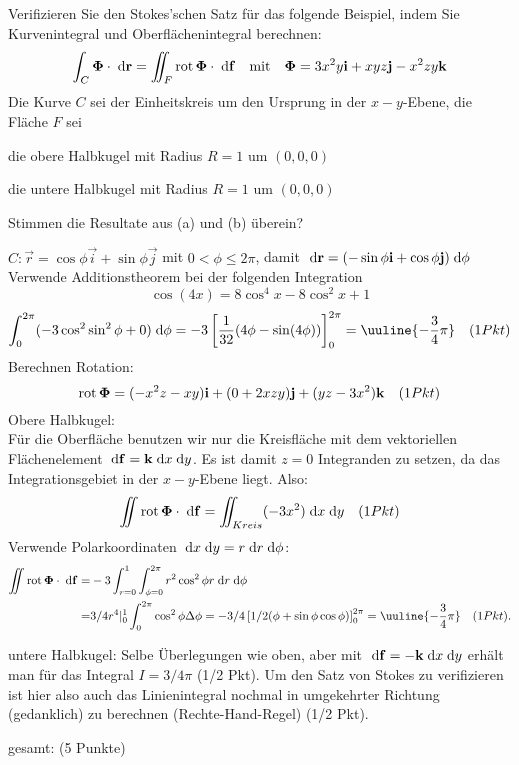 \begin{atiTask}[
  title = Verifikation Satz von Stokes II
]

Verifizieren Sie den Stokes'schen Satz für das folgende Beispiel, indem Sie  Kurvenintegral und Oberflächenintegral berechnen:
\[
\int_C\mathbf{\Phi}\cdot \;\mathrm{d}\mathbf{r}=\iint_F\operatorname{rot} \mathbf{\Phi} \cdot\;\mathrm{d}\mathbf{f}\quad\text{mit}\quad\mathbf{\Phi}=3x^2y\mathbf{i}+xyz\mathbf{j}-x^2zy\mathbf{k}
\]
Die Kurve $C$ sei der Einheitskreis um den Ursprung in der $x-y$-Ebene, die Fläche $F$ sei 
\begin{atiSubtasks}
\item die obere Halbkugel mit Radius $R=1$ um $(0,0,0)$
\item die untere Halbkugel mit Radius $R=1$ um $(0,0,0)$
\end{atiSubtasks}
Stimmen die Resultate aus (a) und (b) überein?

\end{atiTask}

\begin{atiSolution}
\begin{atiSubtasks}
\item $C:\vec{r}=\cos \phi \vec{i}+\sin\phi\vec{j}$ mit $0<\phi\leq 2\pi$, damit $\;\mathrm{d} \mathbf{r}=(-\sin\phi \mathbf{i}+\cos\phi \mathbf{j})\;\mathrm{d}\phi$
Verwende Additionstheorem bei der folgenden Integration
\[
\cos(4x)=8\cos^4x-8\cos^2x+1
\]
\[
\int_0^{2\pi}(-3\cos^2\sin^2\phi+0)\D \phi=-3\left[\frac{1}{32}(4\phi-\sin (4\phi))\right]_0^{2\pi}=\uuline{-\frac{3}{4}\pi}\quad (1 Pkt)
\]
Berechnen Rotation:
\[
\operatorname{rot} \mathbf{\Phi}=(-x^2z-xy)\mathbf{i}+(0+2xzy)\mathbf{j}+(yz-3x^2)\mathbf{k}\quad (1 Pkt)
\]
Obere Halbkugel:\\
Für die Oberfläche benutzen wir nur die Kreisfläche mit dem vektoriellen Flächenelement
$\;\mathrm{d} \mathbf{f}=\mathbf{k} \;\mathrm{d} x\;\mathrm{d} y$. Es ist damit $z=0$ Integranden zu setzen, da das Integrationsgebiet in der $x-y$-Ebene liegt. Also:
\[
\iint \operatorname{rot} \mathbf{\Phi}\cdot \;\mathrm{d} \mathbf{f}= \iint_{Kreis}(-3x^2)\;\mathrm{d} x\;\mathrm{d} y\quad (1 Pkt)
\]
Verwende Polarkoordinaten $\;\mathrm{d} x\;\mathrm{d} y=r\;\mathrm{d} r \;\mathrm{d} \phi$:
\begin{align*}
\iint \curl \vec{\Phi}\cdot \D \vec{f}=& -3 \int_{r=0}^1\int_{\phi=0}^{2\pi}r^2\cos^2\phi r\D r\D \phi\\
=& 3/4r^4|_0^1\int_0^{2\pi}\cos^2\phi\Delta\phi =-3/4\left[1/2(\phi+\sin\phi\cos\phi)\right]_0^{2\pi}=\uuline{-\frac{3}{4}\pi}  \quad (1 Pkt).
\end{align*}
\item untere Halbkugel: Selbe Überlegungen wie oben, aber mit $\;\mathrm{d} \mathbf{f}=-\mathbf{k} \;\mathrm{d} x\;\mathrm{d} y$ erhält man für das Integral $I=3/4\pi$ (1/2 Pkt). Um den Satz von Stokes zu verifizieren ist hier also auch das Linienintegral nochmal in umgekehrter Richtung (gedanklich) zu berechnen (Rechte-Hand-Regel) (1/2 Pkt).
\end{atiSubtasks}
gesamt: (5 Punkte) 
\end{atiSolution}